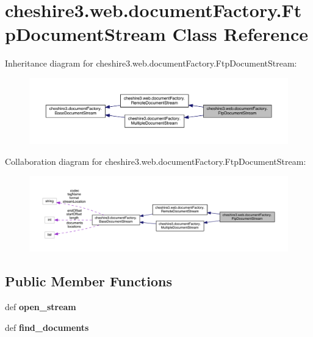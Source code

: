 \hypertarget{classcheshire3_1_1web_1_1document_factory_1_1_ftp_document_stream}{\section{cheshire3.\-web.\-document\-Factory.\-Ftp\-Document\-Stream Class Reference}
\label{classcheshire3_1_1web_1_1document_factory_1_1_ftp_document_stream}
}


Inheritance diagram for cheshire3.\-web.\-document\-Factory.\-Ftp\-Document\-Stream\-:
\nopagebreak
\begin{figure}[H]
\begin{center}
\leavevmode
\includegraphics[width=350pt]{classcheshire3_1_1web_1_1document_factory_1_1_ftp_document_stream__inherit__graph}
\end{center}
\end{figure}


Collaboration diagram for cheshire3.\-web.\-document\-Factory.\-Ftp\-Document\-Stream\-:
\nopagebreak
\begin{figure}[H]
\begin{center}
\leavevmode
\includegraphics[width=350pt]{classcheshire3_1_1web_1_1document_factory_1_1_ftp_document_stream__coll__graph}
\end{center}
\end{figure}
\subsection*{Public Member Functions}
\begin{DoxyCompactItemize}
\item 
\hypertarget{classcheshire3_1_1web_1_1document_factory_1_1_ftp_document_stream_ae4bdd50e367e4c0f2bc88829ca7f1b14}{def {\bfseries open\-\_\-stream}}\label{classcheshire3_1_1web_1_1document_factory_1_1_ftp_document_stream_ae4bdd50e367e4c0f2bc88829ca7f1b14}

\item 
\hypertarget{classcheshire3_1_1web_1_1document_factory_1_1_ftp_document_stream_a5a9f9bf6471fd04d88802b5eb474100f}{def {\bfseries find\-\_\-documents}}\label{classcheshire3_1_1web_1_1document_factory_1_1_ftp_document_stream_a5a9f9bf6471fd04d88802b5eb474100f}

\end{DoxyCompactItemize}
